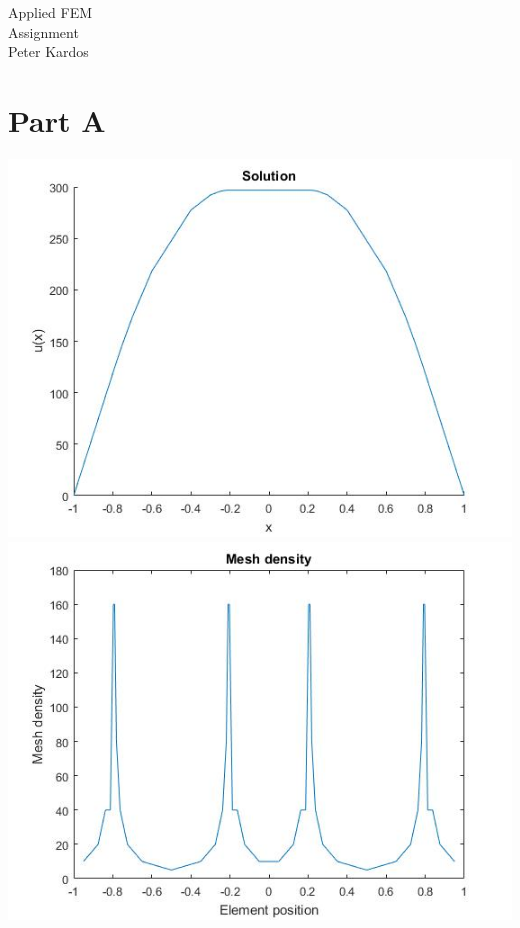 \documentclass[12pt]{article}
\begin{document}
	
	
	\begin{center}
	\Huge Applied FEM\\		
	Assignment\\
	Peter Kardos
	\end{center}
	\vspace{.5pc}	
	
	\iffalse
	\section*{\large Part A}
	\vspace{.5pc}
	
	
	\includegraphics[width=\textwidth]{p1_solution}
	\includegraphics[width=\textwidth]{p1_dens}
\end{document}

